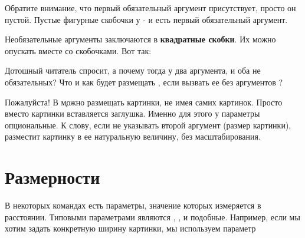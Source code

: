 {{{{Обратите внимание, что первый обязательный аргумент присутствует,
просто он пустой. Пустые фигурные скобочки у  - и
есть первый обязательный аргумент.

Необязательные аргументы заключаются в {\bf квадратные скобки}. Их можно опускать вместе со скобочками. Вот так:

\vbox{
 \hfill
\startTEX
{}
\stopTEX
\stopdescr
}

\vbox{
 \hfill
\startCODERESULT
{}
\stopCODERESULT
\stopdescr
}

Дотошный читатель спросит, а почему тогда у  два аргумента,
и оба не обязательных? Что и как будет размещать , если
вызвать ее без аргументов ?

 \hfill
\startTEX
\externalfigure
\stopTEX
\stopdescr

 \hfill
\startCODERESULT
\externalfigure
\stopCODERESULT
\stopdescr

Пожалуйста! В \c можно размещать картинки, не имея самих картинок. Просто вместо
картинки вставляется заглушка. Именно для этого у  параметры
опциональные. К слову, если не указывать второй аргумент (размер
картинки),  разместит картинку в ее натуральную величину,
без масштабирования.


\section{Размерности}

В некоторых командах есть параметры, значение которых измеряется в
расстоянии. Типовыми параметрами
являются , ,  и подобные. Например,
если мы хотим задать конкретную ширину картинки, мы используем
параметр 

\vbox{
 \hfill
\startTEX
{}
\stopTEX
\stopdescr
}

\vbox{
 \hfill
\startCODERESULT
{}
\stopCODERESULT
\stopdescr
}

}}}}
